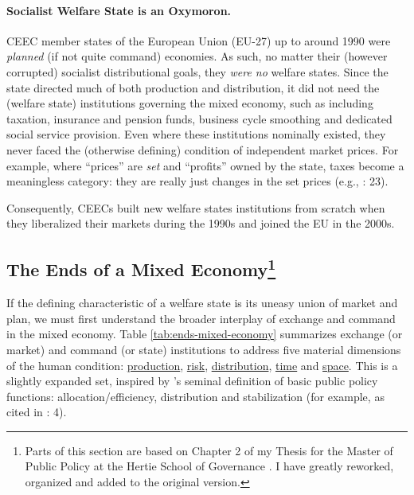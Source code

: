 \paragraph{Socialist Welfare State is an Oxymoron.} \gls{CEEC} member states of the European Union (EU-27) up to around 1990 were \emph{planned} (if not quite command) economies. As such, no matter their (however corrupted) socialist distributional goals, they \emph{were no} welfare states. Since the state directed much of both production and distribution, it did not need the (welfare state) institutions governing the mixed economy, such as including taxation, insurance and pension funds, business cycle smoothing and dedicated social service provision. Even where these institutions nominally existed, they never faced the (otherwise defining) condition of independent market prices. For example, where ``prices'' are \emph{set} and ``profits'' owned by the state, taxes become a meaningless category: they are really just changes in the set prices (e.g., \citealt{Bonker2006}: 23).

Consequently, \glspl{CEEC} built new welfare states institutions from scratch when they liberalized their markets during the 1990s and joined the EU in the 2000s. %

\subsection[Ends]{The Ends of a Mixed Economy\footnote{
	Parts of this section are based on Chapter 2 of my Thesis for the Master of Public Policy at the Hertie School of Governance \citep{Held2010a}. I have greatly reworked, organized and added to the original version.}} \label{sec:ends}
If the defining characteristic of a welfare state is its uneasy union of market and plan, we must first understand the broader interplay of exchange and command in the mixed economy. Table \ref{tab:ends-mixed-economy} summarizes exchange (or market) and command (or state) institutions to address five material dimensions of the human condition: \hyperref[sec:production]{production}, \hyperref[sec:risk]{risk}, \hyperref[sec:distribution]{distribution}, \hyperref[sec:time]{time} and \hyperref[sec:space]{space}. This is a slightly expanded set, inspired by \citeauthor{MusgThet1959}'s \citeyearpar{MusgThet1959} seminal definition of basic public policy functions: allocation/efficiency, distribution and stabilization (for example, as cited in \citealt{Bordo2011}: 4).


